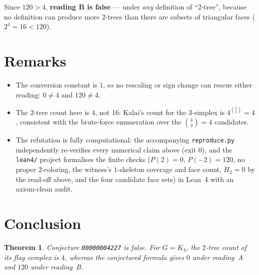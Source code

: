 \documentclass[11pt]{article}
\newtheorem{theorem}{Theorem}
\begin{document}
Since $120 > 4$, \textbf{reading B is false} --- under \emph{any} definition of
``2-tree'', because no definition can produce more $2$-trees than there are
subsets of triangular faces ($2^4 = 16 < 120$).

\section{Remarks}

\begin{itemize}
\item The conversion constant is $1$, so no rescaling or sign change can rescue
either reading: $0 \ne 4$ and $120 \ne 4$.
\item The $2$-tree count here is $4$, not $16$: Kalai's count for the
$3$-simplex is $4^{\binom{2}{2}} = 4$, consistent with the brute-force
enumeration over the $\binom{4}{3} = 4$ candidates.
\item The refutation is fully computational: the accompanying
\texttt{reproduce.py} independently re-verifies every numerical claim above
(exit $0$), and the \texttt{lean4/} project formalises the finite checks
($P(2) = 0$, $P(-2) = 120$, no proper $2$-coloring, the witness's $1$-skeleton
coverage and face count, $H_2 = 0$ by the read-off above, and the four
candidate face sets) in Lean~4 with an axiom-clean audit.
\end{itemize}

\section{Conclusion}

\begin{theorem}
Conjecture \texttt{00000004227} is false.  For $G = K_4$, the $2$-tree count of
its flag complex is $4$, whereas the conjectured formula gives $0$ under
reading~A and $120$ under reading~B.
\end{theorem}
\end{document}
